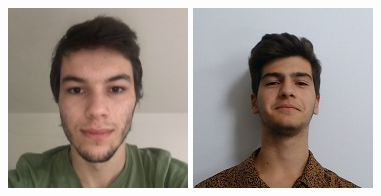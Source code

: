 \documentclass[11pt]{article}
\begin{document}
\begin{titlepage}
\begin{center}
        \begin{figure}[hbt!]
            \includegraphics[width=\linewidth]{images/capa/152.png}
            \centering
            \captionsetup{A89458}
        \endminipage\hfill
            \includegraphics[width=\linewidth]{images/capa/133.jpeg}

\end{figure}
\end{center}
\end{titlepage}
\end{document}
